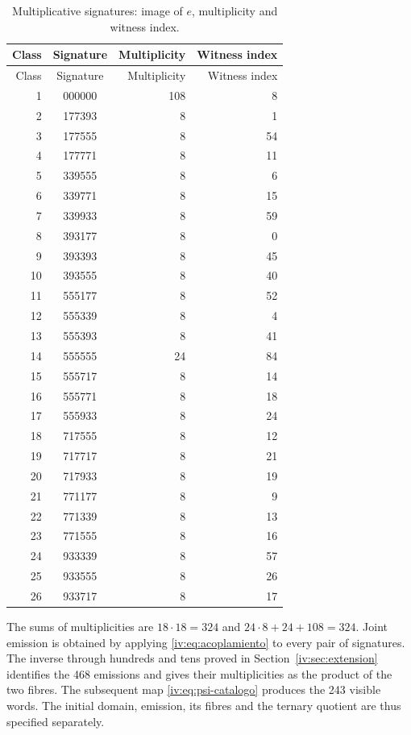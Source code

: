 \begin{longtable}{rcrr}
\caption{Multiplicative signatures: image of \(e\), multiplicity and witness index.}
\label{iv:iv:tabla-firmas-multiplicativas}\\
\toprule
Class & Signature & Multiplicity & Witness index\\
\midrule
\endfirsthead
\toprule
Class & Signature & Multiplicity & Witness index\\
\midrule
\endhead
1&000000&108&8\\
2&177393&8&1\\
3&177555&8&54\\
4&177771&8&11\\
5&339555&8&6\\
6&339771&8&15\\
7&339933&8&59\\
8&393177&8&0\\
9&393393&8&45\\
10&393555&8&40\\
11&555177&8&52\\
12&555339&8&4\\
13&555393&8&41\\
14&555555&24&84\\
15&555717&8&14\\
16&555771&8&18\\
17&555933&8&24\\
18&717555&8&12\\
19&717717&8&21\\
20&717933&8&19\\
21&771177&8&9\\
22&771339&8&13\\
23&771555&8&16\\
24&933339&8&57\\
25&933555&8&26\\
26&933717&8&17\\
\bottomrule
\end{longtable}

The sums of multiplicities are \(18\cdot18=324\) and
\(24\cdot8+24+108=324\). Joint emission is obtained by applying
\eqref{iv:eq:acoplamiento} to every pair of signatures. The inverse through
hundreds and tens proved in Section~\ref{iv:sec:extension} identifies the 468
emissions and gives their multiplicities as the product of the two fibres.
The subsequent map \eqref{iv:eq:psi-catalogo} produces the 243
visible words. The initial domain, emission, its fibres and the ternary
quotient are thus specified separately.


